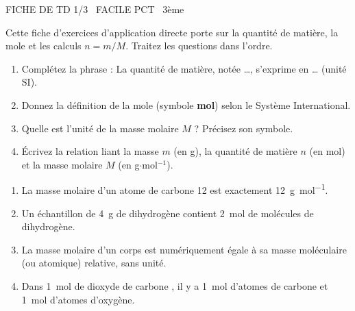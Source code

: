 \documentclass[11pt]{article}
\begin{document}
\begin{tcolorbox}[enhanced,colback=popink,colframe=popink,arc=10pt,boxrule=0pt,left=12pt,right=12pt,top=9pt,bottom=9pt]
{\color{white}\popxbold\small FICHE DE TD 1/3 \textbullet\ FACILE \hfill PCT \textbullet\ 3ème\par}
\end{tcolorbox}
\vspace{4pt}
\noindent Cette fiche d'exercices d'application directe porte sur la quantité de matière, la mole et les calculs $n = m/M$. Traitez les questions dans l'ordre.

\begin{exercice}
\begin{enumerate}
    \item Complétez la phrase : La quantité de matière, notée \ldots{}, s'exprime en \ldots{} (unité SI).
    \item Donnez la définition de la mole (symbole \textbf{mol}) selon le Système International.
    \item Quelle est l'unité de la masse molaire $M$ ? Précisez son symbole.
    \item Écrivez la relation liant la masse $m$ (en g), la quantité de matière $n$ (en mol) et la masse molaire $M$ (en g$\cdot$mol$^{-1}$).
\end{enumerate}
\end{exercice}

\begin{exercice}
\begin{enumerate}
    \item La masse molaire d'un atome de carbone 12 est exactement \SI{12}{g.mol^{-1}}.
    \item Un échantillon de \SI{4}{g} de dihydrogène  contient \SI{2}{mol} de molécules de dihydrogène.
    \item La masse molaire d'un corps est numériquement égale à sa masse moléculaire (ou atomique) relative, sans unité.
    \item Dans \SI{1}{mol} de dioxyde de carbone , il y a \SI{1}{mol} d'atomes de carbone et \SI{1}{mol} d'atomes d'oxygène.
\end{enumerate}
\end{exercice}
\end{document}
